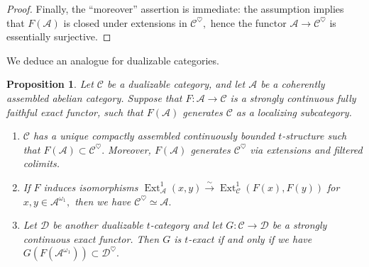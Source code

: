 \documentclass[11pt,leqno]{amsart}
\newtheorem{prop}[theo]{Proposition}
\numberwithin{equation}{section}
\newcommand{\xto}{\xrightarrow}
\newcommand{\cD}{{\mathcal D}}
\newcommand{\cA}{{\mathcal A}}
\newcommand{\cC}{{\mathcal C}}
\newcommand{\Ext}{\operatorname{Ext}}
\begin{document}
\begin{proof}
Finally, the ``moreover'' assertion is immediate: the assumption implies that $F(\cA)$ is closed under extensions in $\cC^{\heartsuit},$ hence the functor $\cA\to\cC^{\heartsuit}$ is essentially surjective. 
\end{proof}

We deduce an analogue for dualizable categories.

\begin{prop}\label{prop:t_structure_on_dualizable_via_functor_from_abelian}
Let $\cC$ be a dualizable category, and let $\cA$ be a coherently assembled abelian category. Suppose that $F:\cA\to\cC$ is a strongly continuous fully faithful exact functor, such that $F(\cA)$ generates $\cC$ as a localizing subcategory. 
\begin{enumerate}[label=(\roman*),ref=(\roman*)]
	\item $\cC$ has a unique compactly assembled continuously bounded $t$-structure such that $F(\cA)\subset\cC^{\heartsuit}.$ Moreover, $F(\cA)$ generates $\cC^{\heartsuit}$ via extensions and filtered colimits. \label{t_structure_via_functor_from_abelian}
	\item If $F$ induces isomorphisms $\Ext^1_{\cA}(x,y)\xto{\sim}\Ext^1_{\cC}(F(x),F(y))$ for $x,y\in\cA^{\omega_1},$ then we have $\cC^{\heartsuit}\simeq\cA.$ \label{when_A_equivalent_to_heart_of_C}
\item Let $\cD$ be another dualizable $t$-category and let $G:\cC\to\cD$ be a strongly continuous exact functor. Then $G$ is $t$-exact if and only if we have $G(F(\cA^{\omega_1}))\subset\cD^{\heartsuit}.$ \label{sufficient_for_t_exactness}
\end{enumerate}
\end{prop}
\end{document}
